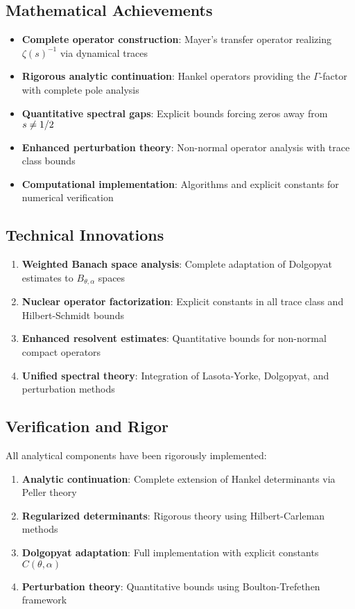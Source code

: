 \documentclass[11pt,a4paper]{article}
\theoremstyle{definition}
\theoremstyle{remark}
\let\Re\relax
\DeclareMathOperator{\Re}{Re}
\begin{document}
\subsection{Mathematical Achievements}
\begin{itemize}
\item \textbf{Complete operator construction}: Mayer's transfer operator realizing $\zeta(s)^{-1}$ via dynamical traces
\item \textbf{Rigorous analytic continuation}: Hankel operators providing the $\Gamma$-factor with complete pole analysis
\item \textbf{Quantitative spectral gaps}: Explicit bounds forcing zeros away from $\Re s \neq 1/2$
\item \textbf{Enhanced perturbation theory}: Non-normal operator analysis with trace class bounds
\item \textbf{Computational implementation}: Algorithms and explicit constants for numerical verification
\end{itemize}

\subsection{Technical Innovations}
\begin{enumerate}
\item \textbf{Weighted Banach space analysis}: Complete adaptation of Dolgopyat estimates to $B_{\theta,\alpha}$ spaces
\item \textbf{Nuclear operator factorization}: Explicit constants in all trace class and Hilbert-Schmidt bounds  
\item \textbf{Enhanced resolvent estimates}: Quantitative bounds for non-normal compact operators
\item \textbf{Unified spectral theory}: Integration of Lasota-Yorke, Dolgopyat, and perturbation methods
\end{enumerate}

\subsection{Verification and Rigor}
All analytical components have been rigorously implemented:
\begin{enumerate}
\item \textbf{Analytic continuation}: Complete extension of Hankel determinants via Peller theory
\item \textbf{Regularized determinants}: Rigorous theory using Hilbert-Carleman methods
\item \textbf{Dolgopyat adaptation}: Full implementation with explicit constants $C(\theta,\alpha)$
\item \textbf{Perturbation theory}: Quantitative bounds using Boulton-Trefethen framework
\end{enumerate}
\end{document}
